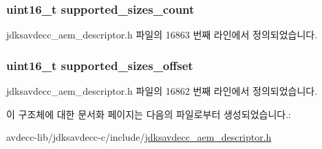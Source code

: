 \subsubsection[{\texorpdfstring{supported\+\_\+sizes\+\_\+count}{supported_sizes_count}}]{\setlength{\rightskip}{0pt plus 5cm}uint16\+\_\+t supported\+\_\+sizes\+\_\+count}\hypertarget{structjdksavdecc__descriptor__video__unit__cluster_a46e215a11ac96892c1e6a2d520e901c0}{}\label{structjdksavdecc__descriptor__video__unit__cluster_a46e215a11ac96892c1e6a2d520e901c0}


jdksavdecc\+\_\+aem\+\_\+descriptor.\+h 파일의 16863 번째 라인에서 정의되었습니다.

\subsubsection[{\texorpdfstring{supported\+\_\+sizes\+\_\+offset}{supported_sizes_offset}}]{\setlength{\rightskip}{0pt plus 5cm}uint16\+\_\+t supported\+\_\+sizes\+\_\+offset}\hypertarget{structjdksavdecc__descriptor__video__unit__cluster_a4de5ca1afb8f583facff9d78d61b98c6}{}\label{structjdksavdecc__descriptor__video__unit__cluster_a4de5ca1afb8f583facff9d78d61b98c6}


jdksavdecc\+\_\+aem\+\_\+descriptor.\+h 파일의 16862 번째 라인에서 정의되었습니다.



이 구조체에 대한 문서화 페이지는 다음의 파일로부터 생성되었습니다.\+:\begin{DoxyCompactItemize}
\item 
avdecc-\/lib/jdksavdecc-\/c/include/\hyperlink{jdksavdecc__aem__descriptor_8h}{jdksavdecc\+\_\+aem\+\_\+descriptor.\+h}\end{DoxyCompactItemize}

